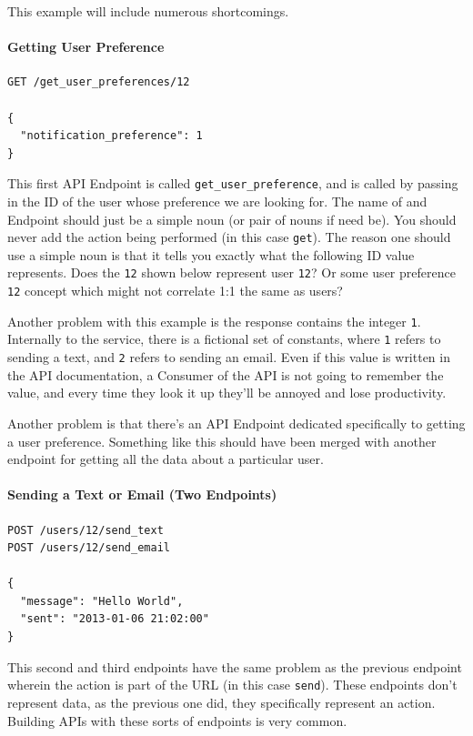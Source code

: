 \documentclass{book}
\begin{document}
This example will include numerous shortcomings.

\paragraph{\textbf{Getting User Preference}}

\begin{verbatim}
GET /get_user_preferences/12

{
  "notification_preference": 1
}
\end{verbatim}

This first API Endpoint is called \texttt{get\_user\_preference}, and is called by passing in the ID of the user whose preference we are looking for. The name of and Endpoint should just be a simple noun (or pair of nouns if need be). You should never add the action being performed (in this case \texttt{get}). The reason one should use a simple noun is that it tells you exactly what the following ID value represents. Does the \texttt{12} shown below represent user \texttt{12}? Or some user preference \texttt{12} concept which might not correlate 1:1 the same as users?

Another problem with this example is the response contains the integer \texttt{1}. Internally to the service, there is a fictional set of constants, where \texttt{1} refers to sending a text, and \texttt{2} refers to sending an email. Even if this value is written in the API documentation, a Consumer of the API is not going to remember the value, and every time they look it up they'll be annoyed and lose productivity.

Another problem is that there's an API Endpoint dedicated specifically to getting a user preference. Something like this should have been merged with another endpoint for getting all the data about a particular user.

\paragraph{\textbf{Sending a Text or Email (Two Endpoints)}}

\begin{verbatim}
POST /users/12/send_text
POST /users/12/send_email

{
  "message": "Hello World",
  "sent": "2013-01-06 21:02:00"
}
\end{verbatim}

This second and third endpoints have the same problem as the previous endpoint wherein the action is part of the URL (in this case \texttt{send}). These endpoints don't represent data, as the previous one did, they specifically represent an action. Building APIs with these sorts of endpoints is very common.
\end{document}
